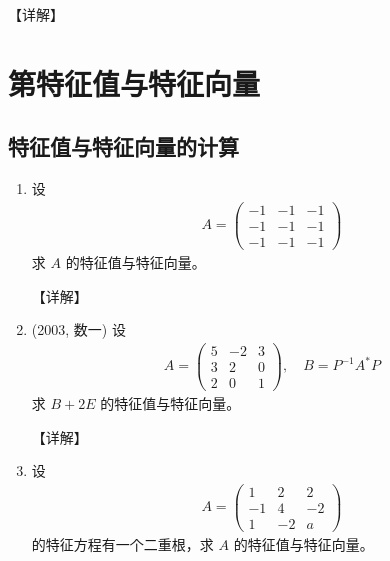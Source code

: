 \documentclass[12pt, a4paper, oneside, UTF8]{ctexbook}
\begin{document}
\begin{enumerate}[label=\arabic*.,start=12]
    \begin{solution}
    【详解】
    \end{solution}
\end{enumerate}

\section{第特征值与特征向量}

\subsection{特征值与特征向量的计算}

\begin{enumerate}[label=\arabic*.]
    \item 设
    \begin{align*}
    A = \begin{pmatrix}
    -1 & -1 & -1 \\
    -1 & -1 & -1 \\
    -1 & -1 & -1
    \end{pmatrix}
    \end{align*}
    求 $A$ 的特征值与特征向量。
    
    \begin{solution}
    【详解】
    \end{solution}
    
    \item (2003, 数一) 设
    \begin{align*}
    A = \begin{pmatrix}
    5 & -2 & 3 \\
    3 & 2 & 0 \\
    2 & 0 & 1
    \end{pmatrix}, \quad
    B = P^{-1} A^* P
    \end{align*}
    求 $B + 2E$ 的特征值与特征向量。
    
    \begin{solution}
    【详解】
    \end{solution}
    
    \item 设
    \begin{align*}
    A = \begin{pmatrix}
    1 & 2 & 2 \\
    -1 & 4 & -2 \\
    1 & -2 & a
    \end{pmatrix}
    \end{align*}
    的特征方程有一个二重根，求 $A$ 的特征值与特征向量。
    

\end{enumerate}
\end{document}
